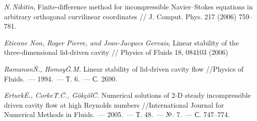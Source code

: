 \begin{thebibliography}{99}

  \textit{N.\,Nikitin}, Finite-difference method for incompressible Navier–Stokes equations in 
  arbitrary orthogonal curvilinear coordinates // J. Comput. Phys. 217 (2006) 759–781.

  \textit{Etienne Non, Roger Pierre, and Jean-Jacques Gervais}, Linear stability of the 
  three-dimensional lid-driven cavity // Physics of Fluids 18, 084103 (2006)
  
   \textit{Ramanan\.N., Homsy\.G.\.M.} Linear stability of lid-driven cavity flow 
  //Physics of Fluids.~--- 1994.~--- Т. 6.~--- С. 2690.
  
   \textit{Erturk\.E., Corke\.T.\.C., Gökçöl\.C.} Numerical solutions of 2-D steady incompressible
  driven cavity flow at high Reynolds numbers //International Journal for Numerical Methods in 
  Fluids.~--- 2005.~--- Т. 48.~--- №. 7.~--- С. 747--774.
  

\end{thebibliography}

